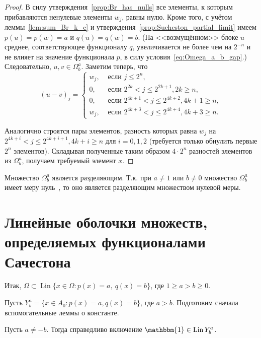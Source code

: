 \begin{proof}
	В силу утверждения~\ref{prop:Br_has_nulls} все элементы, к которым прибавляются ненулевые элементы $w_j$, равны нулю.
	Кроме того, с учётом леммы~\ref{lem:sum_Br_k_c} и утверждения~\ref{prop:Sucheston_partial_limit}
	имеем $p(u)=p(w)=a$ и $q(u)=q(w)=b$.
	(На <<возмущённом>> блоке $u$ среднее, соответствующее функционалу $q$,
	увеличивается не более чем на $2^{-n}$ и не влияет на значение функционала $p$,
	в силу условия~\eqref{eq:Omega_a_b_gap}.)
	Следовательно, $u,v\in\Omega^a_b$.
	Заметим теперь, что
	\begin{equation}
		(u-v)_j = \begin{cases}
			w_j,  & \mbox{~если~} j \leq 2^n,
			\\
			0,  & \mbox{~если~} 2^{2k  } < j \leq 2^{2k+1}, 2k    \geq n,
			\\
			0,  & \mbox{~если~} 2^{4k+1} < j \leq 2^{4k+2}, 4k + 1 \geq n,
			\\
			w_j,  & \mbox{~если~} 2^{4k+3} < j \leq 2^{4k+4}, 4k + 3 \geq n
			.
		\end{cases}
	\end{equation}

	Аналогично строятся пары элементов, разность которых равна $w_j$ на $2^{4k+i} < j \leq 2^{4k+i+1}, 4k + i \geq n$ для $i=0,1,2$
	(требуется только обнулить первые $2^n$ элементов).
	Складывая полученные таким образом $4\cdot 2^n$ разностей элементов из $\Omega^a_b$, получаем требуемый элемент $x$.

\end{proof}

\begin{corollary}
	Множество $\Omega^a_b$ является разделяющим.
	Т.к. при $a\neq 1$ или $b\neq 0$ множество $\Omega^a_b$ имеет меру нуль~\cite{semenov2010characteristic,connor1990almost},
	то оно является разделяющим множеством нулевой меры.
\end{corollary}



\section{Линейные оболочки множеств, определяемых функционалами Сачестона}

Итак, $\Omega \subset \operatorname{Lin}\{x\in\Omega : p(x) = a,~ q(x) = b\}$, где $1\geq a>b\geq 0$.


Пусть $Y^a_b = \{x\in A_0 : p(x) = a, q(x) = b\}$, где $a>b$.
Подготовим сначала вспомогательные леммы о константе.

\begin{lemma}
	\label{lem:const_Lin_alpha_0}
	Пусть $a\neq -b$.
	Тогда справедливо включение
	$\mathbbm{1}\in \operatorname{Lin} Y^a_b$.
\end{lemma}

